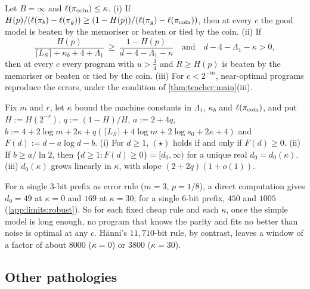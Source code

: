 \begin{proposition}\label{prop:limits:rateblind}
Let $B=\infty$ and $\ell(\pi_{\rm coin})\le\kappa$.
(i) If $H(p)/(\ell(\pi_b)-\ell(\pi_g))\ge(1-H(p))/(\ell(\pi_g)-\ell(\pi_{\rm coin}))$, then at every $c$ the good model is beaten by the memoriser or beaten or tied by the coin.
(ii) If
\[
\frac{H(p)}{\lceil L_S\rceil+\kappa_b+4+\Lambda_1}\ \ge\ \frac{1-H(p)}{d-4-\Lambda_1-\kappa}\quad\text{and}\quad d-4-\Lambda_1-\kappa>0,\tag{$\star$}
\]
then at every $c$ every program with $u>\frac34$ and $R\ge H(p)$ is beaten by the memoriser or beaten or tied by the coin.
(iii) For $c<2^{-m}$, near-optimal programs reproduce the errors, under the condition of \cref{thm:teacher:main}(iii).
\end{proposition}

\begin{lemma}\label{lem:limits:robust}
Fix $m$ and $r$, let $\kappa$ bound the machine constants in $\Lambda_1$, $\kappa_b$ and $\ell(\pi_{\rm coin})$, and put $H:=H(2^{-r})$, $q:=(1-H)/H$, $a:=2+4q$, $b:=4+2\log m+2\kappa+q(\lceil L_S\rceil+4\log m+2\log s_0+2\kappa+4)$ and $F(d):=d-a\log d-b$. (i) For $d\ge1$, $(\star)$ holds if and only if $F(d)\ge0$. (ii) If $b\ge a/\ln2$, then $\{d\ge1:F(d)\ge0\}=[d_0,\infty)$ for a unique real $d_0=d_0(\kappa)$. (iii) $d_0(\kappa)$ grows linearly in $\kappa$, with slope $(2+2q)(1+o(1))$.
\end{lemma}

For a single $3$-bit prefix as error rule ($m=3$, $p=1/8$), a direct computation gives $d_0=49$ at $\kappa=0$ and $169$ at $\kappa=30$; for a single $6$-bit prefix, $450$ and $1005$ (\cref{app:limits:robust}). So for each fixed cheap rule and each $\kappa$, once the simple model is long enough, no program that knows the parity and fits no better than noise is optimal at any $c$. H\"anni's $11{,}710$-bit rule, by contrast, leaves a window of a factor of about $8000$ ($\kappa=0$) or $3800$ ($\kappa=30$).

\subsection{Other pathologies}\label{sec:limits:other}


